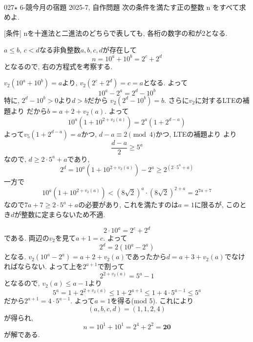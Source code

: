 \begin{prob}{027}{$\star$ 6-競}{今月の宿題 2025-7, 自作問題}
次の条件を満たす正の整数 n をすべて求めよ.

[条件] nを十進法と二進法のどちらで表しても, 各桁の数字の和が2となる.
\end{prob}

$a\leq b$, $c < d$なる非負整数$a,b,c,d$が存在して
\[
n = 10^{a} + 10^{b} = 2^c + 2^d
\]
となるので, 右の方程式を考察する.

\noindent {}

$v_2(10^{a} + 10^{b}) = a$より, $v_2(2^c + 2^d) = c = a$となる. よって
\[
10^{a} - 2^a = 2^d - 10^{b}
\]
特に, $2^d - 10^b > 0$より$d>b$だから $v_2(2^d - 10^b) = b$. さらに$v_2$に対するLTEの補題より
だから$b = a + 2 + v_2(a)$. よって
\[
10^{a}(1 + 10^{2 + v_2(a)}) = 2^a(1 + 2^{d-a})
\]
よって$v_{5}(1 + 2^{d-a}) = a$かつ, $d-a\equiv 2\pmod{4}$かつ, LTEの補題より
より
\[
\frac{d-a}{2} \geq 5^{a}
\]
なので, $d\geq 2\cdot 5^{a} + a$であり,
\[
2^{d} = 10^{a}(1 + 10^{2 + v_2(a)}) - 2^a \geq 2^{(2\cdot 5^{a} + a)}
\]
一方で
\[
10^{a}(1 + 10^{2+v_2(a)}) < (8\sqrt{2})^{a}\cdot (8\sqrt{2})^{2+a} = 2^{7a + 7}
\]
なので$7a + 7 \geq 2\cdot 5^a + a$の必要があり, これを満たすのは$a=1$に限るが, このとき$d$が整数に定まらないため不適.

\noindent{}
\[2\cdot 10^{a} = 2^{c} + 2^d\]
である. 両辺の$v_2$を見て$a+1 = c$. よって
\[
2^d = 2(10^{a} - 2^a)
\]
となる. $v_2(10^{a} - 2^a) = a+2+v_2(a)$であったから$d = a+3+v_2(a)$でなければならない. よって上を$2^{a+1}$で割って
\[
2^{2 + v_2(a)} = 5^a - 1
\]
となるので, $v_2(a) \leq a-1$より
\[
5^a = 1 + 2^{2 + v_2(a)} \leq 1 + 2^{a+1} \leq 1 + 4\cdot 5^{a-1} \leq 5^{a}
\]
だから$2^{a+1} = 4\cdot 5^{a-1}$. よって$a=1$を得る(mod 5). これにより
\[
(a,b,c,d) = (1,1,2,4)
\]
が得られ,
\[
n = 10^{1} + 10^{1} = 2^{4} + 2^{2} = \boldsymbol{20}
\]
が解である.
